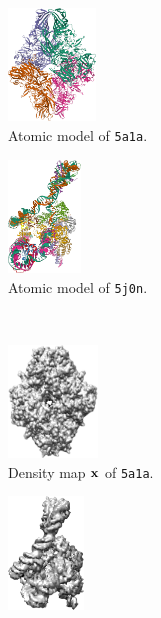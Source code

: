 \begin{figure}[ht!]
    \centering
    \begin{minipage}[b]{0.45\linewidth}
        \centering
        \begin{subfigure}[b]{0.46\linewidth}
            \centering
            \includegraphics[height=3cm]{figures/5a1a_pdb.png}
            \caption{Atomic model of \texttt{5a1a}.}
        \end{subfigure}
        \hfill
        \begin{subfigure}[b]{0.46\linewidth}
            \centering
            \includegraphics[height=3cm]{figures/5j0n_pdb.png}
            \caption{Atomic model of \texttt{5j0n}.}
        \end{subfigure}
        \\ \vspace{0.5em}
        \begin{subfigure}[b]{0.46\linewidth}
            \centering
            \includegraphics[height=3cm]{figures/5a1a_5A_.png}
            \caption{Density map $\mathbf{x}$ of \texttt{5a1a}.}
        \end{subfigure}
        \hfill
        \begin{subfigure}[b]{0.46\linewidth}
            \centering
            \includegraphics[height=3cm]{figures/5j0n_5A_.png}

\end{subfigure}
\end{minipage}
\end{figure}
